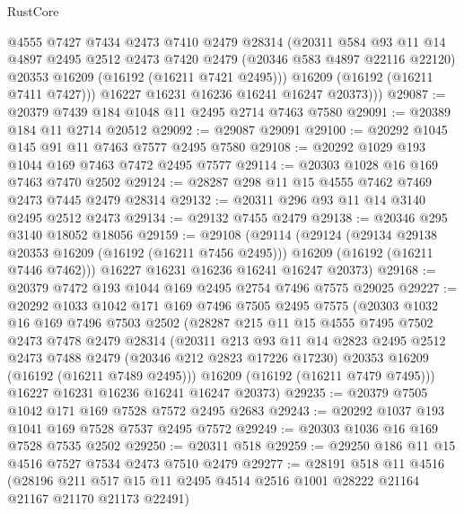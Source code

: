 \begin{lexlean}{RustCore}
\begin{coremodule}
            @4555
            @7427
            @7434
            @2473
            @7410
            @2479
            @28314
            (@20311
              @584
              @93
              @11
              @14
              @4897
              @2495
              @2512
              @2473
              @7420
              @2479
              (@20346 @583 @4897 @22116 @22120)
              @20353
              @16209
              (@16192 (@16211 @7421 @2495)))
            @16209
            (@16192 (@16211 @7411 @7427)))
          @16227
          @16231
          @16236
          @16241
          @16247
          @20373)))
@29087 := @20379 @7439 @184 @1048 @11 @2495 @2714 @7463 @7580
@29091 := @20389 @184 @11 @2714 @20512
@29092 := @29087 @29091
@29100 := @20292 @1045 @145 @91 @11 @7463 @7577 @2495 @7580
@29108 := @20292 @1029 @193 @1044 @169 @7463 @7472 @2495 @7577
@29114 := @20303 @1028 @16 @169 @7463 @7470 @2502
@29124 := @28287 @298 @11 @15 @4555 @7462 @7469 @2473 @7445 @2479 @28314
@29132 := @20311 @296 @93 @11 @14 @3140 @2495 @2512 @2473
@29134 := @29132 @7455 @2479
@29138 := @20346 @295 @3140 @18052 @18056
@29159 := @29108
    (@29114
      (@29124
        (@29134 @29138 @20353 @16209 (@16192 (@16211 @7456 @2495)))
        @16209
        (@16192 (@16211 @7446 @7462)))
      @16227
      @16231
      @16236
      @16241
      @16247
      @20373)
@29168 := @20379 @7472 @193 @1044 @169 @2495 @2754 @7496 @7575 @29025
@29227 := @20292
    @1033
    @1042
    @171
    @169
    @7496
    @7505
    @2495
    @7575
    (@20303
      @1032
      @16
      @169
      @7496
      @7503
      @2502
      (@28287
        @215
        @11
        @15
        @4555
        @7495
        @7502
        @2473
        @7478
        @2479
        @28314
        (@20311
          @213
          @93
          @11
          @14
          @2823
          @2495
          @2512
          @2473
          @7488
          @2479
          (@20346 @212 @2823 @17226 @17230)
          @20353
          @16209
          (@16192 (@16211 @7489 @2495)))
        @16209
        (@16192 (@16211 @7479 @7495)))
      @16227
      @16231
      @16236
      @16241
      @16247
      @20373)
@29235 := @20379 @7505 @1042 @171 @169 @7528 @7572 @2495 @2683
@29243 := @20292 @1037 @193 @1041 @169 @7528 @7537 @2495 @7572
@29249 := @20303 @1036 @16 @169 @7528 @7535 @2502
@29250 := @20311 @518
@29259 := @29250 @186 @11 @15 @4516 @7527 @7534 @2473 @7510 @2479
@29277 := @28191
    @518
    @11
    @4516
    (@28196 @211 @517 @15 @11 @2495 @4514 @2516 @1001 @28222 @21164 @21167 @21170 @21173 @22491)

\end{coremodule}
\end{lexlean}
